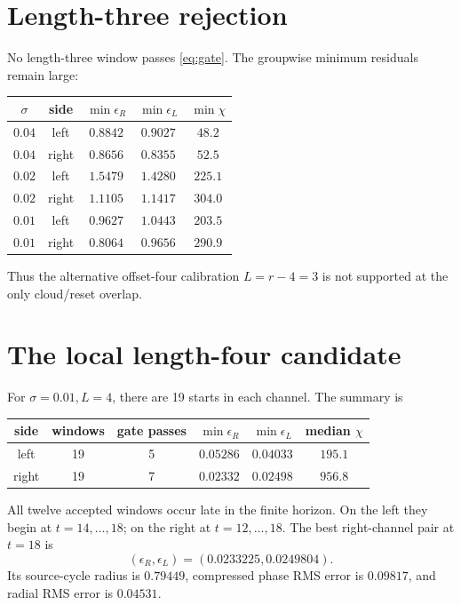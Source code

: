 \documentclass[12pt]{article}
\theoremstyle{remark}
\begin{document}
\section{Length-three rejection}

No length-three window passes \eqref{eq:gate}.  The groupwise minimum
residuals remain large:
\begin{center}
\small
\begin{tabular}{ccccc}
\toprule
$\sigma$ & side & $\min\epsilon_R$ & $\min\epsilon_L$
& $\min\chi$\\
\midrule
$0.04$ & left  & $0.8842$ & $0.9027$ & $48.2$\\
$0.04$ & right & $0.8656$ & $0.8355$ & $52.5$\\
$0.02$ & left  & $1.5479$ & $1.4280$ & $225.1$\\
$0.02$ & right & $1.1105$ & $1.1417$ & $304.0$\\
$0.01$ & left  & $0.9627$ & $1.0443$ & $203.5$\\
$0.01$ & right & $0.8064$ & $0.9656$ & $290.9$\\
\bottomrule
\end{tabular}
\end{center}
Thus the alternative offset-four calibration $L=r-4=3$ is not supported at
the only cloud/reset overlap.

\section{The local length-four candidate}

For $\sigma=0.01,L=4$, there are 19 starts in each channel.  The summary is
\begin{center}
\begin{tabular}{cccccc}
\toprule
side & windows & gate passes & $\min\epsilon_R$ & $\min\epsilon_L$
& median $\chi$\\
\midrule
left  & 19 & 5 & $0.05286$ & $0.04033$ & $195.1$\\
right & 19 & 7 & $0.02332$ & $0.02498$ & $956.8$\\
\bottomrule
\end{tabular}
\end{center}

All twelve accepted windows occur late in the finite horizon.  On the left
they begin at $t=14,\ldots,18$; on the right at
$t=12,\ldots,18$.  The best right-channel pair at $t=18$ is
\begin{equation}\label{eq:best-pair}
 (\epsilon_R,\epsilon_L)
 =(0.0233225,0.0249804).
\end{equation}
Its source-cycle radius is $0.79449$, compressed phase RMS error is
$0.09817$, and radial RMS error is $0.04531$.
\end{document}
